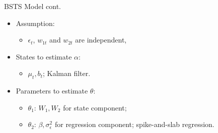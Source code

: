 \documentclass[14pt,xcolor=dvipsnames]{beamer}
\begin{document}
\begin{frame}{BSTS Model cont.}

		\begin{itemize}	
			\item Assumption: 
			\begin{itemize}
			\item	$\epsilon_t$, $w_{1t}$ and $w_{2t}$  are independent,
			\end{itemize}	
			\item States to estimate $\alpha$:
			\begin{itemize}
			\item $\mu_t, b_t$; Kalman filter.			
			 \end{itemize}	
				
			\item Parameters to estimate $\theta$:
				\begin{itemize}
				\item $\theta_1$: $W_{1}, W_{2}$ for state component;
				\item $\theta_2$: $\beta, \sigma_{\epsilon}^2$  for regression component; spike-and-slab regression.
			    \end{itemize}

		\end{itemize}
		








\end{frame}



%		
%		
\end{document}
